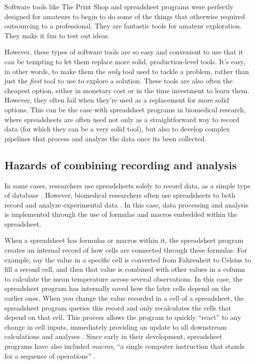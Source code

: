 \documentclass[]{tufte-book}
\begin{document}
Software tools like The Print Shop and spreadsheet programs were perfectly
designed for amateurs to begin to do some of the things that otherwise required
outsourcing to a professional. They are fantastic tools for amateur exploration.
They make it fun to test out ideas.

However, these types of software tools are so easy and convenient to use that it
can be tempting to let them replace more solid, production-level tools. It's
easy, in other words, to make them the \emph{only} tool used to tackle a problem,
rather than just the \emph{first} tool to use to explore a solution. These tools are
also often the cheapest option, either in monetary cost or in the time
investment to learn them. However, they often fail when they're used as a
replacement for more solid options. This can be the case with spreadsheet
programs in biomedical research, where spreadsheets are often used not only as a
straightforward way to record data (for which they can be a very solid tool),
but also to develop complex pipelines that process and analyze the data once its
been collected.

\subsection{Hazards of combining recording and analysis}\label{hazards-of-combining-recording-and-analysis}

In some cases, researchers use spreadsheets solely to record data, as a simple
type of database \citep{birch2018future}. However, biomedical researchers often use
spreadsheets to both record and analyze experimental data \citep{anderson2007issues, broman2018data}. In this case, data processing and analysis is implemented
through the use of formulas and macros embedded within the spreadsheet.

When a spreadsheet has formulas or macros within it, the spreadsheet program
creates an internal record of how cells are connected through these formulas.
For example, say the value in a specific cell is converted from Fahrenheit to
Celsius to fill a second cell, and then that value is combined with other values
in a column to calculate the mean temperature across several observations. In
this case, the spreadsheet program has internally saved how the later cells
depend on the earlier ones. When you change the value recorded in a cell of a
spreadsheet, the spreadsheet program queries this record and only recalculates
the cells that depend on that cell. This process allows the program to quickly
``react'' to any change in cell inputs, immediately providing an update to all
downstream calculations and analyses \citep{levy1984spreadsheet}. Since early in
their development, spreadsheet programs have also included \emph{macros}, ``a single
computer instruction that stands for a sequence of operations''
\citep{creeth1985microcomputer}.
\end{document}
